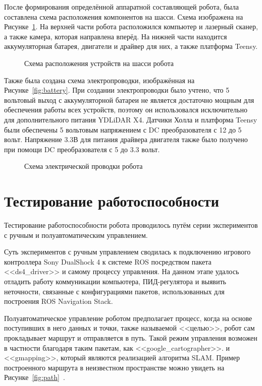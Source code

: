 После формирования определённой аппаратной составляющей робота, была составлена схема расположения компонентов на шасси. Схема изображена на Рисунке~\cref{fig:devices}. На верхней части робота расположился компьютер и лазерный сканер, а также камера, которая направлена вперёд. На нижней части находится аккумуляторная батарея, двигатели и драйвер для них, а также платформа Teensy.

\begin{figure}[ht]
    \caption{Схема расположения устройств на шасси робота}\label{fig:devices}
\end{figure}

Также была создана схема электропроводки, изображённая на Рисунке~\cref{fig:battery}. При создании электропроводки было учтено, что 5 вольтовый выход с аккумуляторной батареи не является достаточно мощным для обеспечения работы всех устройств, поэтому он использовался исключительно для дополнительного питания YDLiDAR X4. Датчики Холла и платформа Teensy были обеспечены 5 вольтовым напряжением с DC преобразователя с 12 до 5 вольт. Напряжение 3.3В для питания драйвера двигателя также было получено при помощи DC преобразователя с 5 до 3.3 вольт.

\begin{figure}[ht]
    \caption{Схема электрической проводки робота}\label{fig:wires}
\end{figure}

\section{Тестирование работоспособности} 
Тестирование работоспособности робота проводилось путём серии экспериментов с ручным и полуавтоматическим управлением.

Суть экспериментов с ручным управлением сводилась к подключению игрового контроллера Sony DualShock 4 к системе ROS посредством пакета <<ds4\_driver>> и самому процессу управления. На данном этапе удалось отладить работу коммуникации компьютера, ПИД-регулятора и выявить неточности, связанные с конфигурациями пакетов, использованных для построения ROS Navigation Stack.

Полуавтоматическое управление роботом предполагает процесс, когда на основе поступивших в него данных и точки, также называемой <<целью>>, робот сам прокладывает маршрут и отправляется в путь. Такой режим управления возможен в частности благодаря таким пакетам, как <<google\_cartographer>>. и <<gmapping>>, который являются реализацией алгоритма SLAM. Пример построенного маршрута в неизвестном пространстве можно увидеть на Рисунке~\cref{fig:path}~\cite{path}. 

